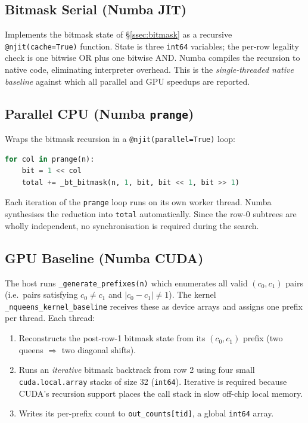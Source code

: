 \documentclass[12pt, letterpaper]{article}
\begin{document}
\subsection{Bitmask Serial (Numba JIT)}

Implements the bitmask state of \S\ref{ssec:bitmask} as a recursive \texttt{@njit(cache=True)} function. State is three \texttt{int64} variables; the per-row legality check is one bitwise OR plus one bitwise AND. Numba compiles the recursion to native code, eliminating interpreter overhead. This is the \emph{single-threaded native baseline} against which all parallel and GPU speedups are reported.

\subsection{Parallel CPU (Numba \texttt{prange})}

Wraps the bitmask recursion in a \texttt{@njit(parallel=True)} loop:
\begin{lstlisting}[language=Python]
for col in prange(n):
    bit = 1 << col
    total += _bt_bitmask(n, 1, bit, bit << 1, bit >> 1)
\end{lstlisting}
Each iteration of the \texttt{prange} loop runs on its own worker thread. Numba synthesises the reduction into \texttt{total} automatically. Since the row-0 subtrees are wholly independent, no synchronisation is required during the search.

\subsection{GPU Baseline (Numba CUDA)}

The host runs \texttt{\_generate\_prefixes(n)} which enumerates all valid $(c_0, c_1)$ pairs (i.e.\ pairs satisfying $c_0 \neq c_1$ and $|c_0 - c_1| \neq 1$). The kernel \texttt{\_nqueens\_kernel\_baseline} receives these as device arrays and assigns one prefix per thread. Each thread:

\begin{enumerate}
    \item Reconstructs the post-row-1 bitmask state from its $(c_0, c_1)$ prefix (two queens $\Rightarrow$ two diagonal shifts).
    \item Runs an \emph{iterative} bitmask backtrack from row 2 using four small \texttt{cuda.local.array} stacks of size 32 (\texttt{int64}). Iterative is required because CUDA's recursion support places the call stack in slow off-chip local memory.
    \item Writes its per-prefix count to \texttt{out\_counts[tid]}, a global \texttt{int64} array.
\end{enumerate}
\end{document}
